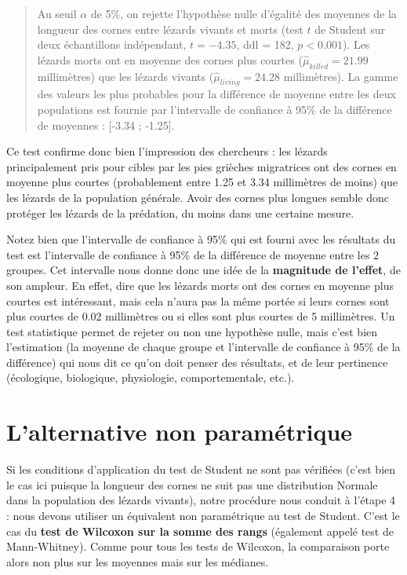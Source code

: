 \documentclass[
  a4paper,
  DIV=11,
  numbers=noendperiod,
  oneside]{scrreprt}
\begin{document}
\begin{quote}
Au seuil \(\alpha\) de 5\%, on rejette l'hypothèse nulle d'égalité des
moyennes de la longueur des cornes entre lézards vivants et morts (test
\(t\) de Student sur deux échantillons indépendant, \(t = -4.35\), ddl =
182, \(p < 0.001\)). Les lézards morts ont en moyenne des cornes plus
courtes (\(\hat{\mu}_{killed} = 21.99\) millimètres) que les lézards
vivants (\(\hat{\mu}_{living} = 24.28\) millimètres). La gamme des
valeurs les plus probables pour la différence de moyenne entre les deux
populations est fournie par l'intervalle de confiance à 95\% de la
différence de moyennes : {[}-3.34 ; -1.25{]}.
\end{quote}

Ce test confirme donc bien l'impression des chercheurs : les lézards
principalement pris pour cibles par les pies grièches migratrices ont
des cornes en moyenne plus courtes (probablement entre 1.25 et 3.34
millimètres de moins) que les lézards de la population générale. Avoir
des cornes plus longues semble donc protéger les lézards de la
prédation, du moins dans une certaine mesure.

Notez bien que l'intervalle de confiance à 95\% qui est fourni avec les
résultats du test est l'intervalle de confiance à 95\% de la différence
de moyenne entre les 2 groupes. Cet intervalle nous donne donc une idée
de la \textbf{magnitude de l'effet}, de son ampleur. En effet, dire que
les lézards morts ont des cornes en moyenne plus courtes est
intéressant, mais cela n'aura pas la même portée si leurs cornes sont
plus courtes de 0.02 millimètres ou si elles sont plus courtes de 5
millimètres. Un test statistique permet de rejeter ou non une hypothèse
nulle, mais c'est bien l'estimation (la moyenne de chaque groupe et
l'intervalle de confiance à 95\% de la différence) qui nous dit ce qu'on
doit penser des résultats, et de leur pertinence (écologique,
biologique, physiologie, comportementale, etc.).

\hypertarget{lalternative-non-paramuxe9trique-2}{%
\section{L'alternative non
paramétrique}\label{lalternative-non-paramuxe9trique-2}}

Si les conditions d'application du test de Student ne sont pas vérifiées
(c'est bien le cas ici puisque la longueur des cornes ne suit pas une
distribution Normale dans la population des lézards vivants), notre
procédure nous conduit à l'étape 4 : nous devons utiliser un équivalent
non paramétrique au test de Student. C'est le cas du \textbf{test de
Wilcoxon sur la somme des rangs} (également appelé test de
Mann-Whitney). Comme pour tous les tests de Wilcoxon, la comparaison
porte alors non plus sur les moyennes mais sur les médianes.
\end{document}

